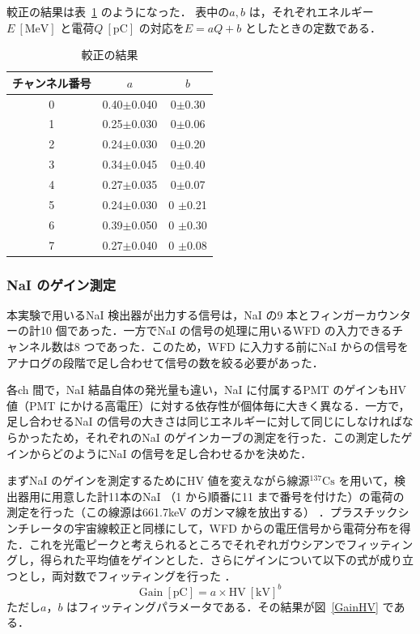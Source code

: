 較正の結果は表~\ref{PS_calib_table} のようになった．
表中の$a, b$ は，それぞれエネルギー$E~[\mathrm{MeV }]$ と電荷$Q~[\mathrm{pC}]$ の対応を$E = a Q + b$ としたときの定数である．
\begin{table}[h]
\caption{較正の結果}
\label{PS_calib_table}
\centering
\begin{tabular}{ccc}\toprule
チャンネル番号 & $a$ & $b$ \\ \midrule
0 & 0.40$\pm$0.040 & 0$\pm$0.30 \\
1 & 0.25$\pm$0.030 & 0$\pm$0.06 \\
2 & 0.24$\pm$0.030 & 0$\pm$0.20 \\
3 & 0.34$\pm$0.045 & 0$\pm$0.40 \\
4 & 0.27$\pm$0.035 & 0$\pm$0.07 \\
5 & 0.24$\pm$0.030 &0 $\pm$0.21 \\
6 & 0.39$\pm$0.050 &0 $\pm$0.30 \\
7 & 0.27$\pm$0.040 &0 $\pm$0.08 \\ \bottomrule
\end{tabular}
\end{table}%

\subsubsection{NaI のゲイン測定}
本実験で用いるNaI 検出器が出力する信号は，NaI の9 本とフィンガーカウンターの計10 個であった．一方でNaI の信号の処理に用いるWFD の入力できるチャンネル数は8 つであった．このため，WFD に入力する前にNaI からの信号をアナログの段階で足し合わせて信号の数を絞る必要があった．

各ch 間で，NaI 結晶自体の発光量も違い，NaI に付属するPMT のゲインもHV 値（PMT にかける高電圧）に対する依存性が個体毎に大きく異なる．一方で，足し合わせるNaI の信号の大きさは同じエネルギーに対して同じにしなければならかったため，それぞれのNaI のゲインカーブの測定を行った．この測定したゲインからどのようにNaI の信号を足し合わせるかを決めた．

まずNaI のゲインを測定するためにHV 値を変えながら線源${}^{137}\mathrm{Cs}$ を用いて，検出器用に用意した計11本のNaI （1 から順番に11 まで番号を付けた）の電荷の測定を行った（この線源は661.7keV のガンマ線を放出する）\cite{IAEA_ENSDF} ．プラスチックシンチレータの宇宙線較正と同様にして，WFD からの電圧信号から電荷分布を得た．これを光電ピークと考えられるところでそれぞれガウシアンでフィッティングし，得られた平均値をゲインとした．さらにゲインについて以下の式が成り立つとし，両対数でフィッティングを行った\cite{Hamamatsu_PMT} ．
\begin{equation}
\mathrm{Gain}~[\mathrm{pC}] = a \times \mathrm{HV}~[\mathrm{kV}]^b \label{gain_curve}  
\end{equation}
ただし$a， b$ はフィッティングパラメータである．その結果が図~\ref{GainHV} である．

